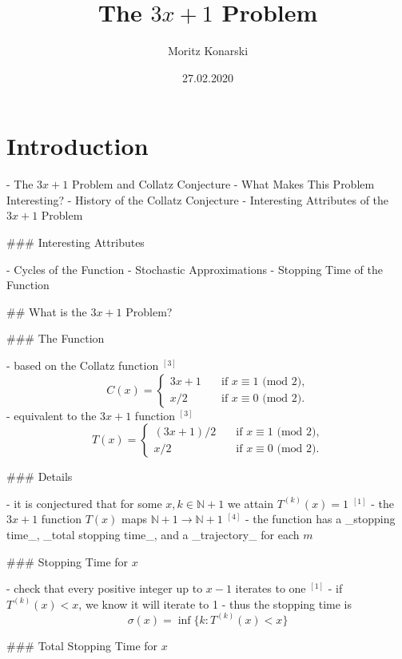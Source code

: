\documentclass[12pt, a4paper, reqno]{amsart}
\title{The $3x+1$ Problem}
\author{Moritz Konarski}
\date{27.02.2020}
\begin{document}
\begin{abstract}
\end{abstract}

\maketitle
\tableofcontents

\section{Introduction}

- The $3x+1$ Problem and Collatz Conjecture
- What Makes This Problem Interesting?
- History of the Collatz Conjecture
- Interesting Attributes of the $3x+1$ Problem

### Interesting Attributes

- Cycles of the Function
- Stochastic Approximations
- Stopping Time of the Function

## What is the $3x+1$ Problem?

### The Function

- based on the Collatz function $^{[3]}$
$$C(x)= \left\{
    \begin{array}{ll}
        3x+1 \quad &\text{if } x \equiv 1 \text{ (mod 2),} \\
        x/2 \quad &\text{if } x \equiv 0 \text{ (mod 2).}
    \end{array}
\right.
$$
- equivalent to the $3x+1$ function $^{[3]}$
$$T(x)= \left\{
    \begin{array}{ll}
        (3x+1)/2 \quad &\text{if } x \equiv 1 \text{ (mod 2),} \\
        x/2 \quad &\text{if } x \equiv 0 \text{ (mod 2).}
    \end{array}
\right.
$$

### Details

- it is conjectured that for some $x,k \in \mathbb{N} + 1$ we attain $T^{(k)}(x)=1$ $^{[1]}$
- the $3x+1$ function $T(x)$ maps $\mathbb{N} + 1 \rightarrow \mathbb{N} + 1$ $^{[4]}$
- the function has a _stopping time_, _total stopping time_, and a _trajectory_ 
for each $m$

### Stopping Time for $x$

- check that every positive integer up to $x - 1$ iterates to one $^{[1]}$
- if $T^{(k)}(x) < x$, we know it will iterate to 1
- thus the stopping time is 
$$\sigma(x)=\inf\{k:T^{(k)}(x) < x\}$$ 

### Total Stopping Time for $x$
\end{document}
